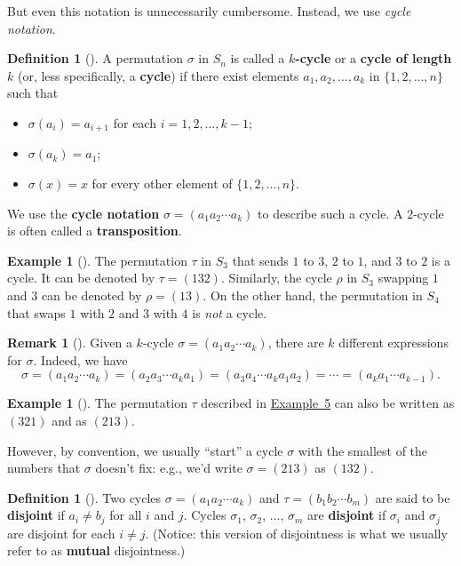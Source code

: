 \documentclass[10pt,]{book}
\newcommand{\terminology}[1]{\textbf{#1}}
\theoremstyle{plain}
\theoremstyle{definition}
\newtheorem{definition}[theorem]{Definition}
\theoremstyle{definition}
\newtheorem{remark}[theorem]{Remark}
\theoremstyle{definition}
\newtheorem{example}[theorem]{Example}
\theoremstyle{definition}
\numberwithin{equation}{section}
\begin{document}
But even this notation is unnecessarily cumbersome. Instead, we use \emph{cycle notation}.%
\begin{definition}[{}]\label{definition-47}
A permutation \(\sigma\) in \(S_n\) is called a \terminology{\(k\)-cycle} or a \terminology{cycle of length \(k\)} (or, less specifically, a \terminology{cycle}) if there exist elements \(a_1,
a_2,\ldots, a_k\) in \(\{1,2,\ldots,n\}\) such that \leavevmode%
\begin{itemize}[label=\textbullet]
\item{}\(\sigma(a_i)=a_{i+1}\) for each \(i=1,2,\ldots, k-1\);%
\item{}\(\sigma(a_k)=a_1\);%
\item{}\(\sigma(x)=x\) for every other element of \(\{1,2,\ldots, n\}\).%
\end{itemize}
%
\par
We use the \terminology{cycle notation} \(\sigma = (a_1 a_2 \cdots a_k)\) to describe such a cycle. A \(2\)-cycle is often called a \terminology{transposition}.%
\end{definition}
\begin{example}[]\label{tr}
The permutation \(\tau\) in \(S_3\) that sends \(1\) to \(3\), \(2\) to \(1\), and \(3\) to \(2\) is a cycle. It can be denoted by \(\tau =(132)\). Similarly, the cycle \(\rho\) in \(S_3\) swapping \(1\) and \(3\) can be denoted by \(\rho=(13)\). On the other hand, the permutation in \(S_4\) that swaps \(1\) with \(2\) and \(3\) with \(4\) is \emph{not} a cycle.%
\end{example}
\begin{remark}[]\label{remark-26}
Given a \(k\)-cycle \(\sigma=(a_1 a_2\cdots a_k)\), there are \(k\) different expressions for \(\sigma\). Indeed, we have%
\begin{equation*}
\sigma=(a_1 a_2\cdots a_k)=(a_2 a_3 \cdots a_k a_1)=(a_3 a_4 \cdots a_k a_1 a_2)=\cdots = (a_k a_1 \cdots a_{k-1}).
\end{equation*}
%
\end{remark}
\begin{example}[]\label{example-52}
The permutation \(\tau\) described in \hyperref[tr]{Example~5} can also be written as \((321)\) and as \((213)\).%
\end{example}
However, by convention, we usually ``start'' a cycle \(\sigma\) with the smallest of the numbers that \(\sigma\) doesn't fix: e.g., we'd write \(\sigma=(213)\) as \((132)\).%
\begin{definition}[{}]\label{definition-48}
Two cycles \(\sigma=(a_1 a_2 \cdots a_k)\) and \(\tau=(b_1
b_2 \cdots b_m)\) are said to be \terminology{disjoint} if \(a_i \neq
b_j\) for all \(i\) and \(j\). Cycles \(\sigma_1\), \(\sigma_2\), \(\ldots\), \(\sigma_m\) are \terminology{disjoint} if \(\sigma_i\) and \(\sigma_j\) are disjoint for each \(i \neq j\). (Notice: this version of disjointness is what we usually refer to as \terminology{mutual} disjointness.)%
\end{definition}
\end{document}
